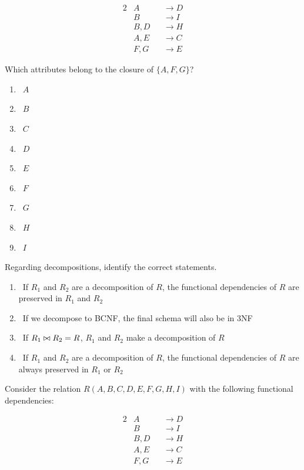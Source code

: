\documentclass{bdad}
\begin{document}
\begin{alignat*}{2}
    & A    && \rightarrow D \\
    & B    && \rightarrow I \\
    & B, D && \rightarrow H \\
    & A, E && \rightarrow C \\
    & F, G && \rightarrow E 
\end{alignat*}

Which attributes belong to the closure of $\{A, F, G\}$?

\begin{enumerate}
    \item \checkbox~$A$
    \item \checkbox~$B$
    \item \checkbox~$C$
    \item \checkbox~$D$
    \item \checkbox~$E$
    \item \checkbox~$F$
    \item \checkbox~$G$
    \item \checkbox~$H$
    \item \checkbox~$I$
\end{enumerate}

Regarding decompositions, identify the correct statements.

\begin{enumerate}
    \item \checkbox~If $R_1$ and $R_2$ are a decomposition of $R$, the functional dependencies of $R$ are preserved in $R_1$ and $R_2$
    \item \checkbox~If we decompose to BCNF, the final schema will also be in 3NF
    \item \checkbox~If $R_1 \bowtie R_2=R$, $R_1$ and $R_2$ make a decomposition of $R$
    \item \checkbox~If $R_1$ and $R_2$ are a decomposition of $R$, the functional dependencies of $R$ are always preserved in $R_1$ or $R_2$
\end{enumerate}

\newpage
{}
Consider the relation $R (A, B, C, D, E, F, G, H, I)$ with the following functional dependencies:

\begin{alignat*}{2}
    & A    && \rightarrow D \\
    & B    && \rightarrow I \\
    & B, D && \rightarrow H \\
    & A, E && \rightarrow C \\
    & F, G && \rightarrow E
\end{alignat*}
\end{document}
